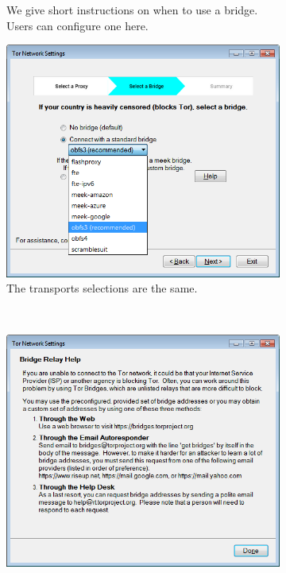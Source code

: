 \documentclass[USenglish,oneside,twocolumn]{article}
\begin{document}
\begin{figure}
\begin{subfigure}[b]{0.35\textwidth}
	\caption{We give short instructions on when to use a bridge. Users can configure one here.}
	\label{fig:new-bridge}
\end{subfigure}
\begin{subfigure}[b]{0.35\textwidth}
	\includegraphics[width=\textwidth]{screenshots/NEW-bridgeSettings-combobox.png}
	\caption{The transports selections are the same.}
	\label{fig:new-bridge-combobox}
\end{subfigure}
~~~~~~~~~~
\begin{subfigure}[b]{0.35\textwidth}
	\includegraphics[width=\textwidth]{screenshots/NEW-bridgeHelp.png}

\end{subfigure}
\end{figure}
\end{document}

